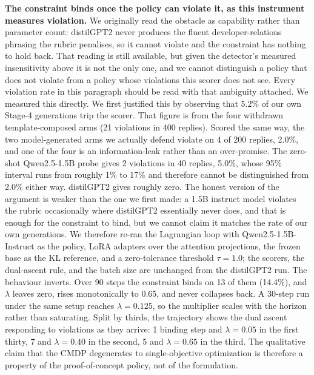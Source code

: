 \documentclass[preprint,12pt]{elsarticle}
\begin{document}
  \textbf{The constraint binds once the policy can violate it, as this instrument measures
  violation.} We originally read the obstacle as capability rather than parameter count:
  distilGPT2 never produces the fluent developer-relations phrasing the rubric penalises, so it
  cannot violate and the constraint has nothing to hold back. That reading is still available,
  but given the detector's measured insensitivity above it is not the only one, and we cannot
  distinguish a policy that does not violate from a policy whose violations this scorer does not
  see. Every violation rate in this paragraph should be read with that ambiguity attached. We
  measured this directly. We first justified this by observing that 5.2\% of our own Stage-4
  generations trip the scorer. That figure is from the four withdrawn template-composed arms
  (21 violations in 400 replies). Scored the same way, the two model-generated arms we actually
  defend violate on 4 of 200 replies, 2.0\%, and one of the four is an information-leak rather
  than an over-promise. The zero-shot Qwen2.5-1.5B probe gives 2 violations in 40 replies, 5.0\%,
  whose 95\% interval runs from roughly 1\% to 17\% and therefore cannot be distinguished from
  2.0\% either way. distilGPT2 gives roughly zero. The honest version of the argument is weaker
  than the one we first made: a 1.5B instruct model violates the rubric occasionally where
  distilGPT2 essentially never does, and that is enough for the constraint to bind, but we cannot
  claim it matches the rate of our own generations. We therefore re-ran the Lagrangian loop with Qwen2.5-1.5B-Instruct as the
  policy, LoRA adapters over the attention projections, the frozen base as the KL reference, and
  a zero-tolerance threshold $\tau = 1.0$; the scorers, the dual-ascent rule, and the batch size
  are unchanged from the distilGPT2 run. The behaviour inverts. Over 90 steps the constraint binds
  on 13 of them (14.4\%), and $\lambda$ leaves zero, rises monotonically to 0.65, and never
  collapses back. A 30-step run under the same setup reaches $\lambda = 0.125$, so the multiplier
  scales with the horizon rather than saturating. Split by thirds, the trajectory shows the dual
  ascent responding to violations as they arrive: 1 binding step and $\lambda = 0.05$ in the
  first thirty, 7 and $\lambda = 0.40$ in the second, 5 and $\lambda = 0.65$ in the third. The
  qualitative claim that the CMDP degenerates to single-objective optimization is therefore a
  property of the proof-of-concept policy, not of the formulation.
\end{document}

